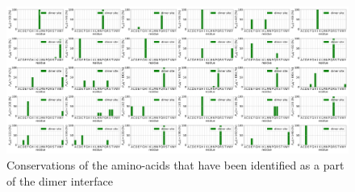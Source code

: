 \begin{figure}
	\label{Conservation BSs}
	\includegraphics[width = .99\linewidth]{figures/Conservation_array_dimer_interface.jpg}
	\caption{Conservations of the amino-acids that have been identified as a part of the dimer interface}
\end{figure}